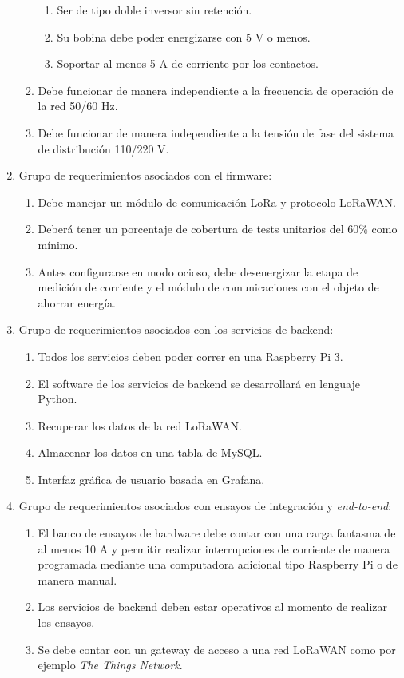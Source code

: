 \begin{enumerate}
\begin{enumerate}
		\begin{enumerate}%
			\item Ser de tipo doble inversor sin retención.
			\item Su bobina debe poder energizarse con 5 V o menos.
			\item Soportar al menos 5 A de corriente por los contactos.
		\end{enumerate} 
		\item Debe funcionar de manera independiente a la frecuencia de operación de la red 50/60 Hz.
		\item Debe funcionar de manera independiente a la tensión de fase del sistema de distribución 110/220 V.
	\end{enumerate}
	\item Grupo de requerimientos asociados con el firmware:
	\begin{enumerate}
		\item Debe manejar un módulo de comunicación LoRa y protocolo LoRaWAN.
		\item Deberá tener un porcentaje de cobertura de tests unitarios del 60\% como mínimo.
		\item Antes configurarse en modo ocioso, debe desenergizar la etapa de medición de corriente y el módulo de comunicaciones con el objeto de ahorrar energía.
	\end{enumerate}
	
	\item Grupo de requerimientos asociados con los servicios de backend:
	\label{requerimientos_backend}
	\begin{enumerate}
		\item Todos los servicios deben poder correr en una Raspberry Pi 3.
		\item El software de los servicios de backend se desarrollará en lenguaje Python.
		\item Recuperar los datos de la red LoRaWAN.\label{requerimiento_LORAWAN}
		\item Almacenar los datos en una tabla de MySQL.
		\item Interfaz gr\'{a}fica de usuario basada en Grafana.
	\end{enumerate}
	
	\item Grupo de requerimientos asociados con ensayos de integración y \textit{end-to-end}:
	\begin{enumerate}
		\item El banco de ensayos de hardware debe contar con una carga fantasma de al menos 10 A y permitir realizar interrupciones de corriente de manera programada mediante una computadora adicional tipo Raspberry Pi o de manera manual.
		\item Los servicios de backend deben estar operativos al momento de realizar los ensayos.
		\item Se debe contar con un gateway de acceso a una red LoRaWAN como por ejemplo \textit{The Things Network}.
	\end{enumerate}
\end{enumerate}



